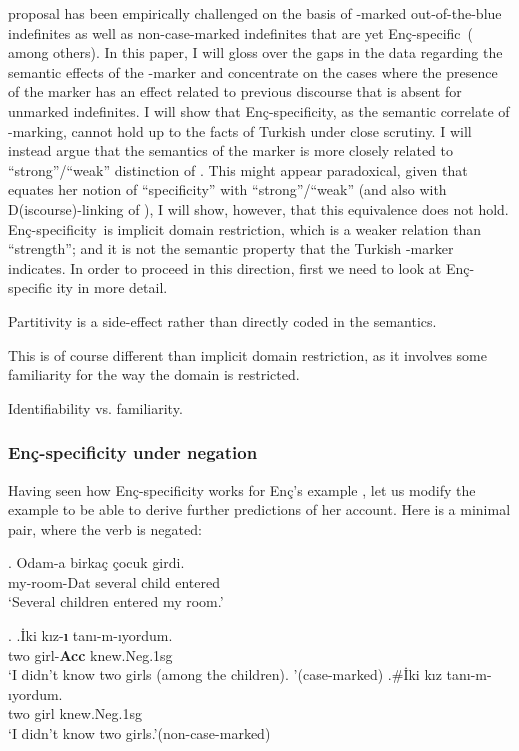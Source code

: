 \documentclass[11pt,a4paper]{article}
\newcommand{\encspec}{Enç-specific}
\begin{document}
 proposal has been empirically challenged on the basis of
\acc-marked out-of-the-blue indefinites as well as non-case-marked
indefinites that are yet \encspec\
(
among others).  In this paper, I will gloss over the gaps in the data
regarding the semantic effects of the \acc-marker and concentrate on
the cases where the presence of the marker has an effect related to
previous discourse that is absent for unmarked indefinites. I will
show that \encspec ity, as the semantic correlate of \acc-marking,
cannot hold up to the facts of Turkish under close scrutiny. I will
instead argue that the semantics of the marker is more closely related
to ``strong''/``weak'' distinction of \ctnm{milsark77}.  This might
appear paradoxical, given that \ctnm{enc91} equates her notion of
``specificity'' with ``strong''/``weak'' (and also with
D(iscourse)-linking of ), I will show, however, that
this equivalence does not hold.  \encspec ity\ is implicit domain
restriction, which is a weaker relation than ``strength''; and it is
not the semantic property that the Turkish \acc-marker indicates. In
order to proceed in this direction, first we need to look at \encspec
ity in more detail.

Partitivity is a side-effect rather than directly coded in the
semantics.

This is of course different than implicit domain restriction, as it
involves some familiarity for the way the domain is restricted.

Identifiability vs. familiarity.



\subsubsection{\encspec ity under negation}

Having seen how \encspec ity works for Enç's example , let us modify the example to be able to derive further predictions of her account. Here is a minimal pair, where the verb  is negated:

\exg.\label{Exenc16neg}%
{Odam-a}  {birka\c{c}} {\c{c}ocuk} {girdi.}\\
{my-room-Dat} {several}  {child}  {entered}\\
`Several children entered my room.'

\ex.\label{Exenc17neg}
\ag.\label{Exencnegacc}{\.Iki}  {k\i{}z-\textbf{\i}} {tan\i{}-m-ıyordum}.\\
{two}  {girl-{\bf Acc}}  {knew.Neg.1sg}\\
`I didn't know two girls (among the children). '\hfill (case-marked)
\bg.\label{Exencnegzero}\#{\.Iki}  {k\i{}z}  {tan\i{}-m-ıyordum.} \\
{two}  {girl}  {knew.Neg.1sg}\\
`I didn't know two girls.'\hfill (non-case-marked)
\end{document}
